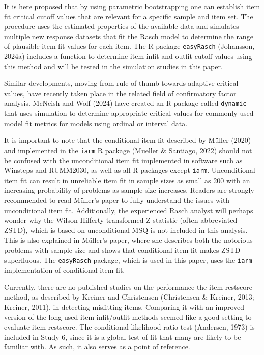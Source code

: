 \documentclass[
  letterpaper,
  DIV=11,
  numbers=noendperiod]{scrartcl}
\begin{document}
It is here proposed that by using parametric bootstrapping one can
establish item fit critical cutoff values that are relevant for a
specific sample and item set. The procedure uses the estimated
properties of the available data and simulates multiple new response
datasets that fit the Rasch model to determine the range of plausible
item fit values for each item. The R package \texttt{easyRasch}
(Johansson, 2024a) includes a function to determine item infit and
outfit cutoff values using this method and will be tested in the
simulation studies in this paper.

Similar developments, moving from rule-of-thumb towards adaptive
critical values, have recently taken place in the related field of
confirmatory factor analysis. McNeish and Wolf (2024) have created an R
package called \texttt{dynamic} that uses simulation to determine
appropriate critical values for commonly used model fit metrics for
models using ordinal or interval data.

It is important to note that the conditional item fit described by
Müller (2020) and implemented in the \texttt{iarm} R package (Mueller \&
Santiago, 2022) should not be confused with the unconditional item fit
implemented in software such as Winsteps and RUMM2030, as well as all R
packages except \texttt{iarm}. Unconditional item fit can result in
unreliable item fit in sample sizes as small as 200 with an increasing
probability of problems as sample size increases. Readers are strongly
recommended to read Müller's paper to fully understand the issues with
unconditional item fit. Additionally, the experienced Rasch analyst will
perhaps wonder why the Wilson-Hilferty transformed Z statistic (often
abbreviated ZSTD), which is based on unconditional MSQ is not included
in this analysis. This is also explained in Müller's paper, where she
describes both the notorious problems with sample size and shows that
conditional item fit makes ZSTD superfluous. The \texttt{easyRasch}
package, which is used in this paper, uses the \texttt{iarm}
implementation of conditional item fit.

Currently, there are no published studies on the performance the
item-restscore method, as described by Kreiner and Christensen
(Christensen \& Kreiner, 2013; Kreiner, 2011), in detecting misfitting
items. Comparing it with an improved version of the long used item
infit/outfit methods seemed like a good setting to evaluate
item-restscore. The conditional likelihood ratio test (Andersen, 1973)
is included in Study 6, since it is a global test of fit that many are
likely to be familiar with. As such, it also serves as a point of
reference.
\end{document}
